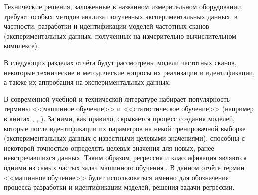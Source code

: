 Технические решения, заложенные в названном измерительном оборудовании, требуют
особых методов анализа полученных экспериментальных данных, в частности,
разработки и идентификации моделей частотных сканов (экспериментальных данных, 
полученных на измерительно-вычислительном комплексе).

В следующих разделах отчёта будут рассмотрены модели частотных сканов, некоторые
технические и методические вопросы их реализации и идентификации, а также их
аппробация на экспериментальных данных.

В современной учебной и технической литературе набирает популярность термины 
<<машинное обучение>> и <<статистическое обучение>> (например в книгах 
\cite{hands_on_ml}, \cite{nikolenko_deep_learning}, 
\cite{elements_of_statistical_learning}). За ними, как правило, скрывается
процесс создания моделей, которые после идентификации их параметров на некой
тренировачной выборке (экспериментальных данных с известными целевыми 
значениями), способны с некоторой точностью определять целевые значения для
новых, ранее невстречавшихся данных. Таким образом, регрессия и классификация
являются одними из самых частых задач машинного обучения \cite{hands_on_ml}.
В данном отчёте термин <<машинное обучение>> будет использоваться именно для 
обозначения процесса разработки и идентификации моделей, решения задачи 
регрессии.